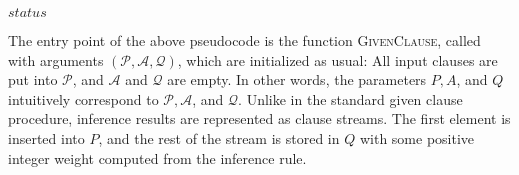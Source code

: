 \begin{algorithmic}[0]
  \vspace{2\jot}


    \Else
      \Else
           
          \EndIf
        \EndFor
         
        \Else{} 
        \EndIf
      \EndIf
    \EndIf
  \EndWhile

  \State \Return $\mathit{status}$

  \EndFunction
\end{algorithmic}
%

The entry point of the above pseudocode is the function \textsc{GivenClause}, called
with arguments $(\mathcal{P}, \mathcal{A}, \mathcal{Q})$, which are initialized
as usual: All input clauses are put into $\mathcal{P}$, and $\mathcal{A}$ and
$\mathcal{Q}$ are empty. In other words, the parameters $P, A$, and $Q$ intuitively
correspond to $\mathcal{P}, \mathcal{A}$, and $\mathcal{Q}$. Unlike in the
standard given clause procedure, inference results are represented as clause
streams. The first element is inserted into $P$, and the rest of the stream is
stored in $Q$ with some positive integer weight computed from the inference
rule.

